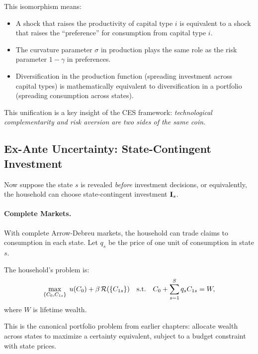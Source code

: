 \begin{calloutnote}[Interpretation]
This isomorphism means:
\begin{itemize}[nosep]
\item A shock that raises the productivity of capital type $i$ is equivalent to a shock that raises the ``preference'' for consumption from capital type $i$.
\item The curvature parameter $\sigma$ in production plays the same role as the risk parameter $1-\gamma$ in preferences.
\item Diversification in the production function (spreading investment across capital types) is mathematically equivalent to diversification in a portfolio (spreading consumption across states).
\end{itemize}

This unification is a key insight of the CES framework: \emph{technological complementarity and risk aversion are two sides of the same coin}.
\end{calloutnote}

\subsection{Ex-Ante Uncertainty: State-Contingent Investment}
\label{subsec:ac-risk-exante}

Now suppose the state $s$ is revealed \emph{before} investment decisions, or equivalently, the household can choose state-contingent investment $\mathbf{I}_s$.

\paragraph{Complete Markets.}
With complete Arrow-Debreu markets, the household can trade claims to consumption in each state. Let $q_s$ be the price of one unit of consumption in state $s$.

The household's problem is:
\begin{equation}
\max_{\{C_0, C_{1s}\}} \; u(C_0) + \beta \, \mathcal{R}(\{C_{1s}\}) \quad \text{s.t.} \quad C_0 + \sum_{s=1}^{S} q_s C_{1s} = W,
\label{eq:ac-risk-complete}
\end{equation}
where $W$ is lifetime wealth.

This is the canonical portfolio problem from earlier chapters: allocate wealth across states to maximize a certainty equivalent, subject to a budget constraint with state prices.

